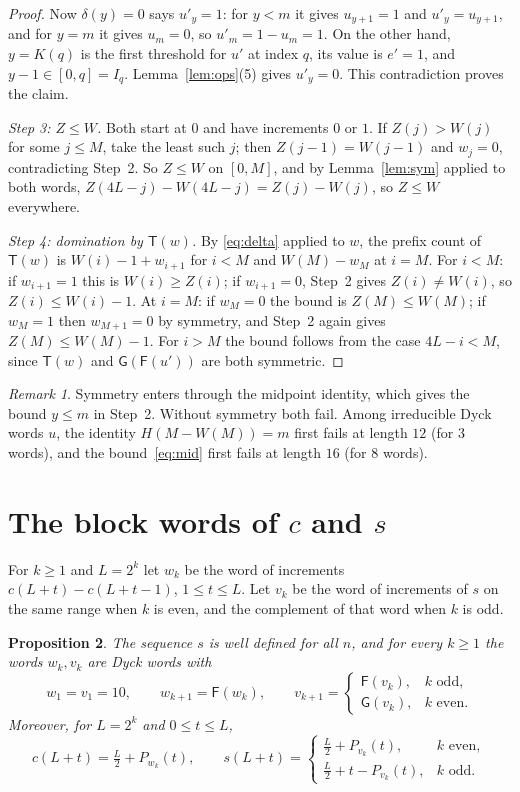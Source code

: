 \documentclass[11pt]{amsart}
\newtheorem{proposition}{Proposition}[section]
\theoremstyle{definition}
\theoremstyle{remark}
\newtheorem{remark}[proposition]{Remark}
\numberwithin{equation}{section}
\newcommand{\cF}{\mathsf F}
\newcommand{\cG}{\mathsf G}
\newcommand{\cT}{\mathsf T}
\begin{document}
\begin{proof}
Now $\delta(y)=0$ says $u'_y=1$: for $y<m$ it gives $u_{y+1}=1$ and $u'_y=u_{y+1}$, and for $y=m$ it gives $u_m=0$, so $u'_m=1-u_m=1$. On the other hand, $y=K(q)$ is the first threshold for $u'$ at index $q$, its value is $e'=1$, and $y-1\in[0,q]=I_q$. Lemma~\ref{lem:ops}(5) gives $u'_y=0$. This contradiction proves the claim.

\smallskip\noindent\emph{Step 3: $Z\le W$.} Both start at $0$ and have increments $0$ or $1$. If $Z(j)>W(j)$ for some $j\le M$, take the least such $j$; then $Z(j-1)=W(j-1)$ and $w_j=0$, contradicting Step~2. So $Z\le W$ on $[0,M]$, and by Lemma~\ref{lem:sym} applied to both words, $Z(4L-j)-W(4L-j)=Z(j)-W(j)$, so $Z\le W$ everywhere.

\smallskip\noindent\emph{Step 4: domination by $\cT(w)$.} By \eqref{eq:delta} applied to $w$, the prefix count of $\cT(w)$ is $W(i)-1+w_{i+1}$ for $i<M$ and $W(M)-w_M$ at $i=M$. For $i<M$: if $w_{i+1}=1$ this is $W(i)\ge Z(i)$; if $w_{i+1}=0$, Step~2 gives $Z(i)\ne W(i)$, so $Z(i)\le W(i)-1$. At $i=M$: if $w_M=0$ the bound is $Z(M)\le W(M)$; if $w_M=1$ then $w_{M+1}=0$ by symmetry, and Step~2 again gives $Z(M)\le W(M)-1$. For $i>M$ the bound follows from the case $4L-i<M$, since $\cT(w)$ and $\cG(\cF(u'))$ are both symmetric.
\end{proof}

\begin{remark}\label{rem:sym}
Symmetry enters through the midpoint identity, which gives the bound $y\le m$ in Step~2. Without symmetry both fail. Among irreducible Dyck words $u$, the identity $H(M-W(M))=m$ first fails at length $12$ (for $3$ words), and the bound~\eqref{eq:mid} first fails at length $16$ (for $8$ words).
\end{remark}

\section{The block words of \texorpdfstring{$c$}{c} and \texorpdfstring{$s$}{s}}\label{sec:blocks}

For $k\ge1$ and $L=2^k$ let $w_k$ be the word of increments $c(L+t)-c(L+t-1)$, $1\le t\le L$. Let $v_k$ be the word of increments of $s$ on the same range when $k$ is even, and the complement of that word when $k$ is odd.

\begin{proposition}\label{prop:blocks}
The sequence $s$ is well defined for all $n$, and for every $k\ge1$ the words $w_k,v_k$ are Dyck words with
\[
w_1=v_1=10,\qquad w_{k+1}=\cF(w_k),\qquad v_{k+1}=\begin{cases}\cF(v_k),&k\text{ odd},\\ \cG(v_k),&k\text{ even}.\end{cases}
\]
Moreover, for $L=2^k$ and $0\le t\le L$,
\begin{equation}\label{eq:blocks}
c(L+t)=\tfrac L2+P_{w_k}(t),\qquad s(L+t)=\begin{cases}\tfrac L2+P_{v_k}(t),&k\text{ even},\\ \tfrac L2+t-P_{v_k}(t),&k\text{ odd}.\end{cases}
\end{equation}
\end{proposition}
\end{document}
